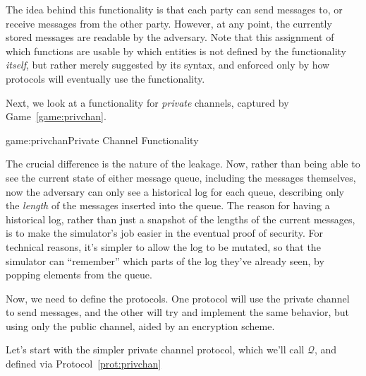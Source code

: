 The idea behind this functionality is that each party can send messages to,
or receive messages from the other party.
However, at any point, the currently stored messages are readable by
the adversary.
Note that this assignment of which functions
are usable by which entities is not defined by the functionality \emph{itself},
but rather merely suggested by its syntax, and enforced only by how
protocols will eventually use the functionality.

Next, we look at a functionality for \emph{private} channels,
captured by Game~\ref{game:privchan}.

\begin{game}{game:privchan}{Private Channel Functionality}
\end{game}

The crucial difference is the nature of the leakage.
Now, rather than being able to see the current state of either message queue,
including the messages themselves, now the adversary can only
see a historical log for each queue, describing only the \emph{length}
of the messages inserted into the queue.
The reason for having a historical log, rather than just a snapshot
of the lengths of the current messages,
is to make the simulator's job easier
in the eventual proof of security.
For technical reasons, it's simpler to allow the log to be mutated,
so that the simulator can ``remember'' which parts of the log they've
already seen, by popping elements from the queue.

Now, we need to define the protocols.
One protocol will use the private channel to send messages,
and the other will try and implement the same behavior,
but using only the public channel, aided by an encryption scheme.

Let's start with the simpler private channel protocol, which we'll
call $\mathcal{Q}$,
and defined via Protocol~\ref{prot:privchan}

